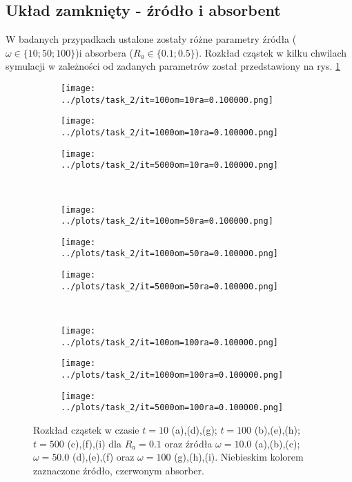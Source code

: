\documentclass[a4paper, 12pt]{article}
\begin{document}
	
\newpage
	
\subsection*{Układ zamknięty - źródło i absorbent}
	
W badanych przypadkach ustalone zostały różne parametry źródła ($\omega \in \{10; 50; 100\}$)i absorbera ($R_a \in \{0.1;0.5\}$). Rozkład cząstek w kilku chwilach symulacji w zależności od zadanych parametrów został przedstawiony na rys. \ref{rozklad_ra1}

\begin{figure}[H]
	\centering
	\begin{subfigure}{0.30\textwidth}
		\centering
		\texttt{[image: ../plots/task\_2/it=100om=10ra=0.100000.png]}
		\caption{}
	\end{subfigure}
	\begin{subfigure}{0.30\textwidth}
		\centering
		\texttt{[image: ../plots/task\_2/it=1000om=10ra=0.100000.png]}
		\caption{}
	\end{subfigure}
	\begin{subfigure}{0.30\textwidth}
		\centering
		\texttt{[image: ../plots/task\_2/it=5000om=10ra=0.100000.png]}
		\caption{}
	\end{subfigure}
	\\
	\begin{subfigure}{0.30\textwidth}
		\centering
		\texttt{[image: ../plots/task\_2/it=100om=50ra=0.100000.png]}
		\caption{}
	\end{subfigure}
	\begin{subfigure}{0.30\textwidth}
		\centering
		\texttt{[image: ../plots/task\_2/it=1000om=50ra=0.100000.png]}
		\caption{}
	\end{subfigure}
	\begin{subfigure}{0.30\textwidth}
		\centering
		\texttt{[image: ../plots/task\_2/it=5000om=50ra=0.100000.png]}
		\caption{}
	\end{subfigure}
	\\
	\begin{subfigure}{0.30\textwidth}
		\centering
		\texttt{[image: ../plots/task\_2/it=100om=100ra=0.100000.png]}
		\caption{}
	\end{subfigure}
	\begin{subfigure}{0.30\textwidth}
		\centering
		\texttt{[image: ../plots/task\_2/it=1000om=100ra=0.100000.png]}
		\caption{}
	\end{subfigure}
	\begin{subfigure}{0.30\textwidth}
		\centering
		\texttt{[image: ../plots/task\_2/it=5000om=100ra=0.100000.png]}
		\caption{}
	\end{subfigure}
	
	\caption{Rozkład cząstek w czasie $t=10$ (a),(d),(g); $t=100$ (b),(e),(h); $t=500$ (c),(f),(i) dla $R_a = 0.1$ oraz źródła $\omega = 10.0$ (a),(b),(c); $\omega = 50.0$ (d),(e),(f) oraz $\omega = 100$ (g),(h),(i). Niebieskim kolorem zaznaczone źródło, czerwonym absorber.}
	\label{rozklad_ra1}
\end{figure}
\end{document}
